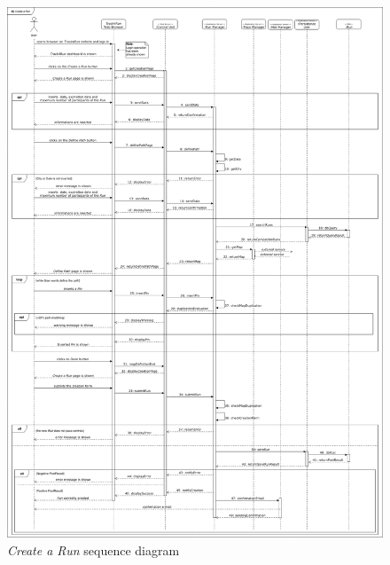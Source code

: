 \begin{figure}[H]
  \begin{center}
  	\includegraphics[width=\textwidth]{./img/sequence/createRun.png}
    \hspace{0.05\linewidth}
    \centering
    \caption{\textit{Create a Run} sequence diagram}
		\label{img:createRun}
    \end{center}
\end{figure}

